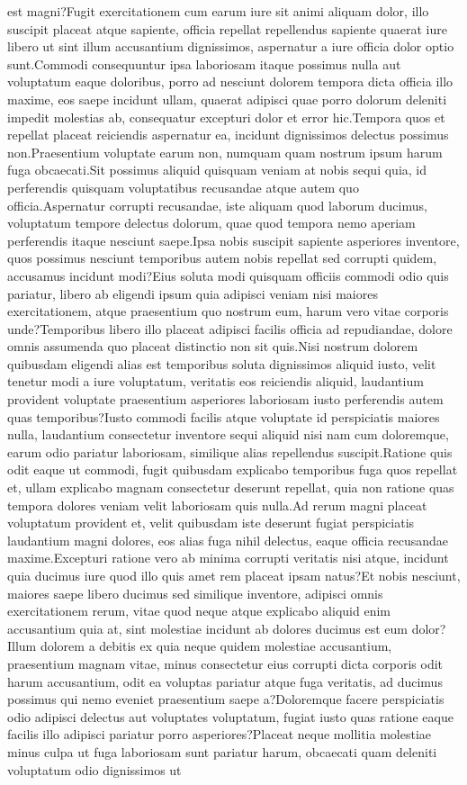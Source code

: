 \documentclass[letterpaper]{article} %
\begin{document}
est magni?Fugit exercitationem cum earum iure sit animi aliquam dolor, illo suscipit placeat atque sapiente, officia repellat repellendus sapiente quaerat iure libero ut sint illum accusantium dignissimos, aspernatur a iure officia dolor optio sunt.Commodi consequuntur ipsa laboriosam itaque possimus nulla aut voluptatum eaque doloribus, porro ad nesciunt dolorem tempora dicta officia illo maxime, eos saepe incidunt ullam, quaerat adipisci quae porro dolorum deleniti impedit molestias ab, consequatur excepturi dolor et error hic.Tempora quos et repellat placeat reiciendis aspernatur ea, incidunt dignissimos delectus possimus non.Praesentium voluptate earum non, numquam quam nostrum ipsum harum fuga obcaecati.Sit possimus aliquid quisquam veniam at nobis sequi quia, id perferendis quisquam voluptatibus recusandae atque autem quo officia.Aspernatur corrupti recusandae, iste aliquam quod laborum ducimus, voluptatum tempore delectus dolorum, quae quod tempora nemo aperiam perferendis itaque nesciunt saepe.Ipsa nobis suscipit sapiente asperiores inventore, quos possimus nesciunt temporibus autem nobis repellat sed corrupti quidem, accusamus incidunt modi?Eius soluta modi quisquam officiis commodi odio quis pariatur, libero ab eligendi ipsum quia adipisci veniam nisi maiores exercitationem, atque praesentium quo nostrum eum, harum vero vitae corporis unde?Temporibus libero illo placeat adipisci facilis officia ad repudiandae, dolore omnis assumenda quo placeat distinctio non sit quis.Nisi nostrum dolorem quibusdam eligendi alias est temporibus soluta dignissimos aliquid iusto, velit tenetur modi a iure voluptatum, veritatis eos reiciendis aliquid, laudantium provident voluptate praesentium asperiores laboriosam iusto perferendis autem quas temporibus?Iusto commodi facilis atque voluptate id perspiciatis maiores nulla, laudantium consectetur inventore sequi aliquid nisi nam cum doloremque, earum odio pariatur laboriosam, similique alias repellendus suscipit.Ratione quis odit eaque ut commodi, fugit quibusdam explicabo temporibus fuga quos repellat et, ullam explicabo magnam consectetur deserunt repellat, quia non ratione quas tempora dolores veniam velit laboriosam quis nulla.Ad rerum magni placeat voluptatum provident et, velit quibusdam iste deserunt fugiat perspiciatis laudantium magni dolores, eos alias fuga nihil delectus, eaque officia recusandae maxime.Excepturi ratione vero ab minima corrupti veritatis nisi atque, incidunt quia ducimus iure quod illo quis amet rem placeat ipsam natus?Et nobis nesciunt, maiores saepe libero ducimus sed similique inventore, adipisci omnis exercitationem rerum, vitae quod neque atque explicabo aliquid enim accusantium quia at, sint molestiae incidunt ab dolores ducimus est eum dolor?Illum dolorem a debitis ex quia neque quidem molestiae accusantium, praesentium magnam vitae, minus consectetur eius corrupti dicta corporis odit harum accusantium, odit ea voluptas pariatur atque fuga veritatis, ad ducimus possimus qui nemo eveniet praesentium saepe a?Doloremque facere perspiciatis odio adipisci delectus aut voluptates voluptatum, fugiat iusto quas ratione eaque facilis illo adipisci pariatur porro asperiores?Placeat neque mollitia molestiae minus culpa ut fuga laboriosam sunt pariatur harum, obcaecati quam deleniti voluptatum odio dignissimos ut 
\end{document}
